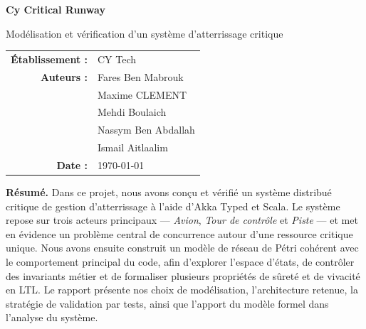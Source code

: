 \documentclass[11pt,a4paper]{article}
\begin{document}
\begin{titlepage}
    \centering
    \vspace*{2cm}

    {\Huge\bfseries\color{accent} Cy Critical Runway \par}
    \vspace{0.5cm}
    {\Large Modélisation et vérification d'un système d'atterrissage critique \par}
    \vspace{1.2cm}


    \vfill

    \begin{tabular}{rl}
        \textbf{Établissement :} & CY Tech \\
        \textbf{Auteurs :} & Fares Ben Mabrouk \\
                           & Maxime CLEMENT \\
                           & Mehdi Boulaich \\
                           & Nassym Ben Abdallah \\
                           & Ismail Aitlaalim \\
        \textbf{Date :} & \today
    \end{tabular}

    \vfill

    \begin{minipage}{0.9\textwidth}
        \small
        \textbf{Résumé.}
        Dans ce projet, nous avons conçu et vérifié un système distribué critique de gestion d'atterrissage à l'aide d'Akka Typed et Scala. Le système repose sur trois acteurs principaux --- \emph{Avion}, \emph{Tour de contrôle} et \emph{Piste} --- et met en évidence un problème central de concurrence autour d'une ressource critique unique. Nous avons ensuite construit un modèle de réseau de Pétri cohérent avec le comportement principal du code, afin d'explorer l'espace d'états, de contrôler des invariants métier et de formaliser plusieurs propriétés de sûreté et de vivacité en LTL. Le rapport présente nos choix de modélisation, l'architecture retenue, la stratégie de validation par tests, ainsi que l'apport du modèle formel dans l'analyse du système.
    \end{minipage}
\end{titlepage}
\end{document}

